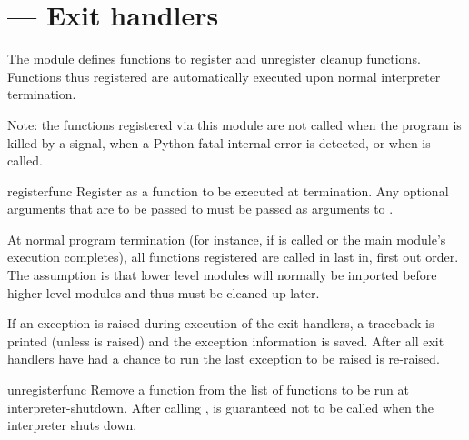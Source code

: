 \section{ ---
         Exit handlers}




The  module defines functions to register and
unregister cleanup functions.  Functions thus registered are
automatically executed upon normal interpreter termination.

Note: the functions registered via this module are not called when
the program is killed by a signal, when a Python fatal internal
error is detected, or when  is called.

\begin{funcdesc}{register}{func}
Register  as a function to be executed at termination.  Any
optional arguments that are to be passed to  must be passed
as arguments to .

At normal program termination (for instance, if
 is called or the main module's execution
completes), all functions registered are called in last in, first out
order.  The assumption is that lower level modules will normally be
imported before higher level modules and thus must be cleaned up
later.

If an exception is raised during execution of the exit handlers, a
traceback is printed (unless  is raised) and the
exception information is saved.  After all exit handlers have had a
chance to run the last exception to be raised is re-raised.

\end{funcdesc}

\begin{funcdesc}{unregister}{func}
Remove a function  from the list of functions to be run at
interpreter-shutdown.  After calling ,
 is guaranteed not to be called when the interpreter
shuts down.

\end{funcdesc}


